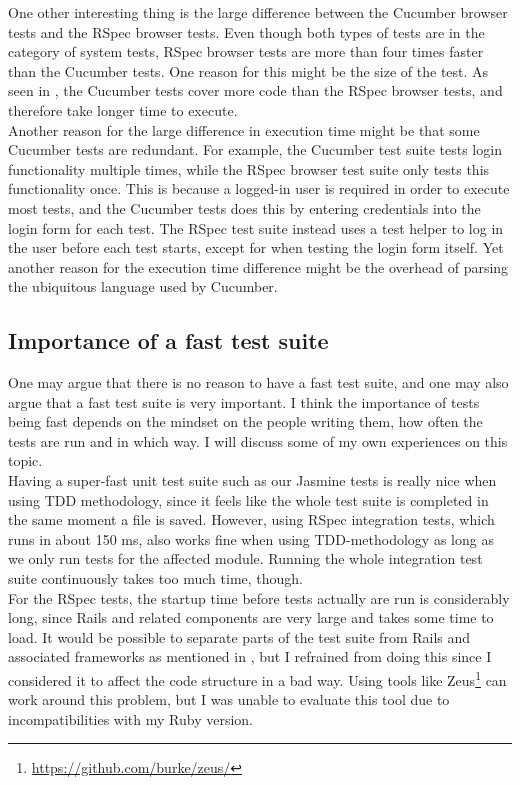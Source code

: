 One other interesting thing is the large difference between the Cucumber
browser tests and the RSpec browser tests. Even though both types of
tests are in the category of system tests, RSpec browser tests are more
than four times faster than the Cucumber tests. One reason for this
might be the size of the test. As seen in ,
the Cucumber tests cover more code than the RSpec browser tests, and
therefore take longer time to execute.\\

Another reason for the large difference in execution time might be that
some Cucumber tests are redundant. For example, the Cucumber test suite
tests login functionality multiple times, while the RSpec browser test
suite only tests this functionality once. This is because a logged-in
user is required in order to execute most tests, and the Cucumber tests
does this by entering credentials into the login form for each test. The
RSpec test suite instead uses a test helper to log in the user before
each test starts, except for when testing the login form itself. Yet
another reason for the execution time difference might be the overhead
of parsing the ubiquitous language used by Cucumber.\\


\subsection{Importance of a fast test suite}

One may argue that there is no reason to have a fast test suite, and one
may also argue that a fast test suite is very important. I think the
importance of tests being fast depends on the mindset on the people
writing them, how often the tests are run and in which way. I will
discuss some of my own experiences on this topic.\\

Having a super-fast unit test suite such as our Jasmine tests is really
nice when using TDD methodology, since it feels like the whole test
suite is completed in the same moment a file is saved. However, using
RSpec integration tests, which runs in about 150 ms, also works
fine when using TDD-methodology as long as we only run tests for the
affected module. Running the whole integration test suite continuously
takes too much time, though.\\

For the RSpec tests, the startup time before tests actually are run is
considerably long, since Rails and related components are very large and
takes some time to load. It would be possible to separate parts of the
test suite from Rails and associated frameworks as mentioned in
, but I refrained from doing this since I
considered it to affect the code structure in a bad way. Using tools
like Zeus\footnote{\url{https://github.com/burke/zeus/}} can work around
this problem, but I was unable to evaluate this tool due to
incompatibilities with my Ruby version.\\

